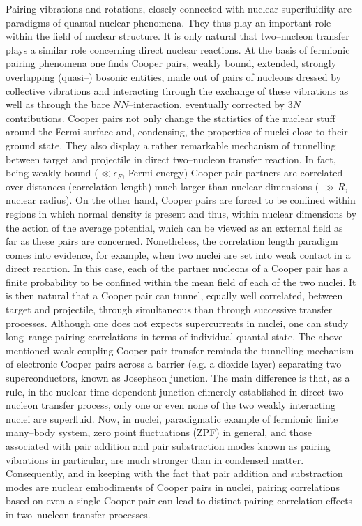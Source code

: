 Pairing vibrations and rotations, closely connected with nuclear superfluidity are  paradigms of quantal nuclear phenomena. They thus play an important  role within the field of nuclear structure. It is only natural that two--nucleon transfer plays a similar role concerning direct nuclear reactions. 
At the basis of fermionic pairing phenomena one finds Cooper pairs, weakly bound, extended, strongly overlapping (quasi--) bosonic entities, made out of pairs of nucleons dressed by collective vibrations and interacting through the exchange of these vibrations as well as through the bare $NN$--interaction, eventually corrected by $3N$ contributions.
Cooper pairs not only change the statistics of the nuclear stuff around the Fermi surface and, condensing, the properties of nuclei close to their ground state. They also display a rather remarkable mechanism of tunnelling between  target and projectile in  direct two--nucleon transfer reaction. In fact, being weakly bound ($\ll \epsilon_F$, Fermi energy) Cooper pair partners are correlated over distances (correlation length) much larger than nuclear dimensions ( $\gg R$, nuclear radius). On the other hand, Cooper pairs are forced to be confined within regions in which normal density is present and thus, within nuclear dimensions  by the action of the average potential, which can be viewed as an external field as far as these pairs are concerned. Nonetheless, the
 correlation length paradigm comes into evidence, for example, when two nuclei are set into weak contact in a direct reaction. In this case, each of the partner nucleons of a Cooper pair has a finite probability to be confined within the mean field of each of the two nuclei. It is then natural that a Cooper pair can tunnel, equally well correlated, between target and projectile, through simultaneous than through successive transfer processes. Although one does not expects supercurrents in nuclei, one can study long--range pairing correlations in terms of individual quantal state. The above mentioned weak coupling Cooper pair transfer reminds  the tunnelling mechanism of electronic Cooper pairs across a barrier (e.g. a dioxide layer) separating two superconductors, known as Josephson junction. The main difference is that, as a rule, in the nuclear time dependent junction efimerely established in  direct two--nucleon transfer process, only one or even none of the two weakly interacting nuclei are superfluid. Now, in nuclei, paradigmatic example of fermionic  finite many--body system, zero point fluctuations  (ZPF) in general, and those associated with pair addition and pair substraction modes known as pairing vibrations in particular, are much stronger than in condensed matter. Consequently, and in keeping with the fact that pair addition and substraction modes are  nuclear embodiments of Cooper pairs in nuclei,   pairing correlations based on even  a single Cooper pair can lead to distinct pairing correlation effects in two--nucleon transfer processes. 


